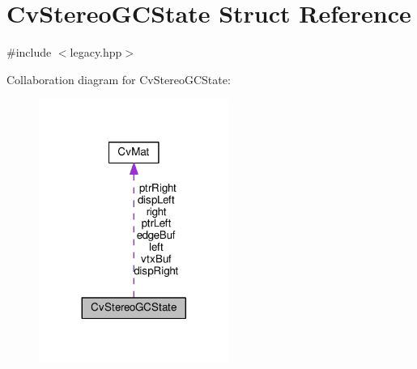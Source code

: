 \hypertarget{structCvStereoGCState}{\section{Cv\-Stereo\-G\-C\-State Struct Reference}
\label{structCvStereoGCState}
}


{\ttfamily \#include $<$legacy.\-hpp$>$}



Collaboration diagram for Cv\-Stereo\-G\-C\-State\-:\nopagebreak
\begin{figure}[H]
\begin{center}
\leavevmode
\includegraphics[width=176pt]{structCvStereoGCState__coll__graph}
\end{center}
\end{figure}
